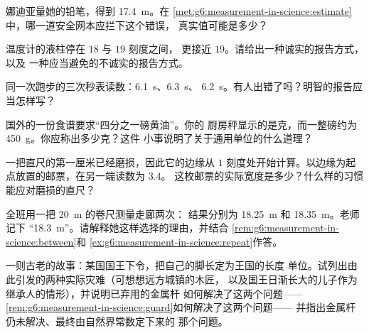 \begin{exercise}[$\star$]\label{exo:g6:measurement-in-science:6}
娜迪亚量她的铅笔，得到 \qty{17.4}{m}。在
\cref{met:g6:measurement-in-science:estimate}中，哪一道安全网本应拦下这个错误，
真实值可能是多少？
\end{exercise}

\begin{exercise}[$\star$]\label{exo:g6:measurement-in-science:7}
温度计的液柱停在 $18$ 与 $19$ 刻度之间，
更接近 $19$。请给出一种诚实的报告方式，以及
一种应当避免的不诚实的报告方式。
\end{exercise}

\begin{exercise}[$\star$]\label{exo:g6:measurement-in-science:8}
同一次跑步的三次秒表读数：\qty{6.1}{s}、\qty{6.3}{s}、
\qty{6.2}{s}。有人出错了吗？明智的报告应当怎样写？
\end{exercise}

\begin{exercise}[$\star\star$]\label{exo:g6:measurement-in-science:9}
国外的一份食谱要求“四分之一磅黄油”。你的
厨房秤显示的是克，而一整磅约为
\qty{450}{g}。你应称出多少克？这件
小事说明了关于通用单位的什么道理？
\end{exercise}

\begin{exercise}[$\star\star$]\label{exo:g6:measurement-in-science:10}
一把直尺的第一厘米已经磨损，因此它的边缘从
$1$ 刻度处开始计算。以边缘为起点放置的邮票，在另一端读数为 $3.4$。
这枚邮票的实际宽度是多少？什么样的习惯能应对磨损的直尺？
\end{exercise}

\begin{exercise}[$\star\star$]\label{exo:g6:measurement-in-science:11}
全班用一把 \qty{20}{m} 的卷尺测量走廊两次：
结果分别为 \qty{18.25}{m} 和 \qty{18.35}{m}。老师记下
“\qty{18.3}{m}”。请解释她这样选择的理由，并结合
\cref{rem:g6:measurement-in-science:between}和
\cref{ex:g6:measurement-in-science:repeat}作答。
\end{exercise}

\begin{exercise}[$\star\star\star$]\label{exo:g6:measurement-in-science:12}
一则古老的故事：某国国王下令，把自己的脚长定为王国的长度
单位。试列出由此引发的两种实际灾难（可想想远方城镇的木匠，
以及国王日渐长大的儿子作为继承人的情形），并说明已弃用的金属杆
如何解决了这两个问题——
\cref{rem:g6:measurement-in-science:guard}如何解决了这两个问题——
并指出金属杆仍未解决、最终由自然界常数定下来的
那个问题。
\end{exercise}

